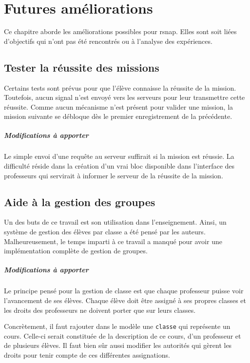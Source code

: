 \chapter{Futures améliorations}
Ce chapitre aborde les améliorations possibles pour \gls{rsnap}. Elles sont soit liées d'objectifs qui n'ont pas été rencontrés ou à l'analyse des expériences.

\section{Tester la réussite des missions}
Certains tests sont prévus pour que l'élève connaisse la réussite de la \gls{mission}. Toutefois, aucun signal n'est envoyé vers les serveurs pour leur transmettre cette réussite. Comme aucun mécanisme n'est présent pour valider une \gls{mission}, la \gls{mission} suivante se débloque dès le premier enregistrement de la précédente.

\paragraph{Modifications à apporter}
Le simple envoi d'une requête au serveur suffirait si la \gls{mission} est réussie. La difficulté réside dans la création d'un vrai \gls{bloc} disponible dans l'interface des professeurs qui servirait à informer le serveur de la réussite de la \gls{mission}.

\section{Aide à la gestion des groupes}
Un des buts de ce travail est son utilisation dans l'enseignement. Ainsi, un système de gestion des élèves par classe a été pensé par les auteurs. Malheureusement, le temps imparti à ce travail a manqué pour avoir une implémentation complète de gestion de groupes.

\paragraph{Modifications à apporter}
Le principe pensé pour la gestion de classe est que chaque professeur puisse voir l'avancement de ses élèves. Chaque élève doit être assigné à ses propres classes et les droits des professeurs ne doivent porter que sur leurs classes.

Concrètement, il faut rajouter dans le modèle une \texttt{classe} qui représente un cours. Celle-ci serait constituée de la description de ce cours, d'un professeur et de plusieurs élèves. Il faut bien sûr aussi modifier les autorités qui gèrent les droits pour tenir compte de ces différentes assignations.


